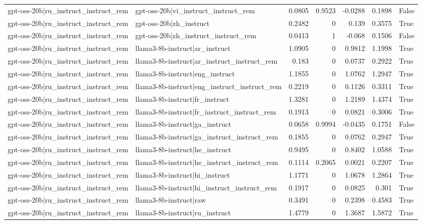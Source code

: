 \begin{table}
\begin{tabular}{l l r r r r l}
gpt-oss-20b|ru_instruct_instruct_rem & gpt-oss-20b|vi_instruct_instruct_rem & 0.0805 & 0.9523 & -0.0288 & 0.1898 & False \\
gpt-oss-20b|ru_instruct_instruct_rem & gpt-oss-20b|zh_instruct & 0.2482 & 0 & 0.139 & 0.3575 & True \\
gpt-oss-20b|ru_instruct_instruct_rem & gpt-oss-20b|zh_instruct_instruct_rem & 0.0413 & 1 & -0.068 & 0.1506 & False \\
gpt-oss-20b|ru_instruct_instruct_rem & llama3-8b-instruct|ar_instruct & 1.0905 & 0 & 0.9812 & 1.1998 & True \\
gpt-oss-20b|ru_instruct_instruct_rem & llama3-8b-instruct|ar_instruct_instruct_rem & 0.183 & 0 & 0.0737 & 0.2922 & True \\
gpt-oss-20b|ru_instruct_instruct_rem & llama3-8b-instruct|eng_instruct & 1.1855 & 0 & 1.0762 & 1.2947 & True \\
gpt-oss-20b|ru_instruct_instruct_rem & llama3-8b-instruct|eng_instruct_instruct_rem & 0.2219 & 0 & 0.1126 & 0.3311 & True \\
gpt-oss-20b|ru_instruct_instruct_rem & llama3-8b-instruct|fr_instruct & 1.3281 & 0 & 1.2189 & 1.4374 & True \\
gpt-oss-20b|ru_instruct_instruct_rem & llama3-8b-instruct|fr_instruct_instruct_rem & 0.1913 & 0 & 0.0821 & 0.3006 & True \\
gpt-oss-20b|ru_instruct_instruct_rem & llama3-8b-instruct|ga_instruct & 0.0658 & 0.9994 & -0.0435 & 0.1751 & False \\
gpt-oss-20b|ru_instruct_instruct_rem & llama3-8b-instruct|ga_instruct_instruct_rem & 0.1855 & 0 & 0.0762 & 0.2947 & True \\
gpt-oss-20b|ru_instruct_instruct_rem & llama3-8b-instruct|he_instruct & 0.9495 & 0 & 0.8402 & 1.0588 & True \\
gpt-oss-20b|ru_instruct_instruct_rem & llama3-8b-instruct|he_instruct_instruct_rem & 0.1114 & 0.2065 & 0.0021 & 0.2207 & True \\
gpt-oss-20b|ru_instruct_instruct_rem & llama3-8b-instruct|hi_instruct & 1.1771 & 0 & 1.0678 & 1.2864 & True \\
gpt-oss-20b|ru_instruct_instruct_rem & llama3-8b-instruct|hi_instruct_instruct_rem & 0.1917 & 0 & 0.0825 & 0.301 & True \\
gpt-oss-20b|ru_instruct_instruct_rem & llama3-8b-instruct|raw & 0.3491 & 0 & 0.2398 & 0.4583 & True \\
gpt-oss-20b|ru_instruct_instruct_rem & llama3-8b-instruct|ru_instruct & 1.4779 & 0 & 1.3687 & 1.5872 & True \\

\end{tabular}
\end{table}
